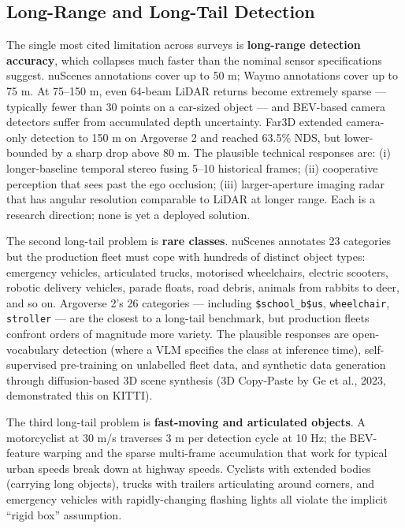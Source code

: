 \documentclass{article}
\begin{document}
\subsection{Long-Range and Long-Tail Detection}\label{long-range-and-long-tail-detection}

The single most cited limitation across surveys is \textbf{long-range detection accuracy}, which collapses much faster than the nominal sensor specifications suggest. nuScenes annotations cover up to 50 m; Waymo annotations cover up to 75 m. At 75--150 m, even 64-beam LiDAR returns become extremely sparse --- typically fewer than 30 points on a car-sized object --- and BEV-based camera detectors suffer from accumulated depth uncertainty. Far3D \citep{jiang2024far3dexpandingtheh} extended camera-only detection to 150 m on Argoverse 2 and reached 63.5\% NDS, but lower-bounded by a sharp drop above 80 m. The plausible technical responses are: (i) longer-baseline temporal stereo fusing 5--10 historical frames; (ii) cooperative perception that sees past the ego occlusion; (iii) larger-aperture imaging radar that has angular resolution comparable to LiDAR at longer range. Each is a research direction; none is yet a deployed solution.

The second long-tail problem is \textbf{rare classes}. nuScenes annotates 23 categories but the production fleet must cope with hundreds of distinct object types: emergency vehicles, articulated trucks, motorised wheelchairs, electric scooters, robotic delivery vehicles, parade floats, road debris, animals from rabbits to deer, and so on. Argoverse 2's 26 categories --- including \texttt{\$school\_b\$us}, \texttt{wheelchair}, \texttt{stroller} --- are the closest to a long-tail benchmark, but production fleets confront orders of magnitude more variety. The plausible responses are open-vocabulary detection (where a VLM specifies the class at inference time), self-supervised pre-training on unlabelled fleet data, and synthetic data generation through diffusion-based 3D scene synthesis (3D Copy-Paste by Ge et al., 2023, demonstrated this on KITTI).

The third long-tail problem is \textbf{fast-moving and articulated objects}. A motorcyclist at 30 m/s traverses 3 m per detection cycle at 10 Hz; the BEV-feature warping and the sparse multi-frame accumulation that work for typical urban speeds break down at highway speeds. Cyclists with extended bodies (carrying long objects), trucks with trailers articulating around corners, and emergency vehicles with rapidly-changing flashing lights all violate the implicit ``rigid box'' assumption.
\end{document}
